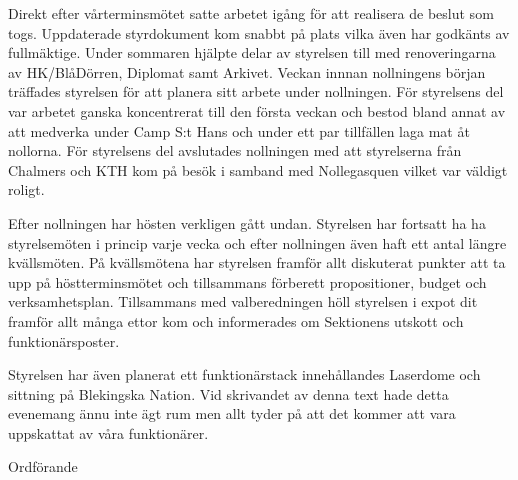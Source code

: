 \documentclass[../_main/handlingar.tex]{subfiles}
\begin{document}

Direkt efter vårterminsmötet satte arbetet igång för att realisera de beslut som togs. Uppdaterade styrdokument kom snabbt på plats vilka även har godkänts av fullmäktige. Under sommaren hjälpte delar av styrelsen till med renoveringarna av HK/BlåDörren, Diplomat samt Arkivet. Veckan innnan nollningens början träffades styrelsen för att planera sitt arbete under nollningen. För styrelsens del var arbetet ganska koncentrerat till den första veckan och bestod bland annat av att medverka under Camp S:t Hans och under ett par tillfällen laga mat åt nollorna. För styrelsens del avslutades nollningen med att styrelserna från Chalmers och KTH kom på besök i samband med Nollegasquen vilket var väldigt roligt.

Efter nollningen har hösten verkligen gått undan. Styrelsen har fortsatt ha ha styrelsemöten i princip varje vecka och efter nollningen även haft ett antal längre kvällsmöten. På kvällsmötena har styrelsen framför allt diskuterat punkter att ta upp på höstterminsmötet och tillsammans förberett propositioner, budget och verksamhetsplan. Tillsammans med valberedningen höll styrelsen i expot dit framför allt många ettor kom och informerades om Sektionens utskott och funktionärsposter.

Styrelsen har även planerat ett funktionärstack innehållandes Laserdome och sittning på Blekingska Nation. Vid skrivandet av denna text hade detta evenemang ännu inte ägt rum men allt tyder på att det kommer att vara uppskattat av våra funktionärer.

\begin{signatures}{1}
    \mvh
    \signature{\ordf}{Ordförande}
\end{signatures}
\end{document}
